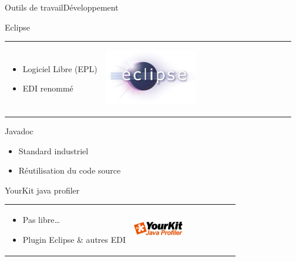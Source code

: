 \begin{frame}{Outils de travail}{Développement}
\begin{block}{Eclipse}
	\begin{tabular}{l l}
			\begin{minipage}{0.5\textwidth}
				\begin{itemize}
				\item Logiciel Libre (EPL)
				\item EDI renommé
				\end{itemize}
		\end{minipage}&\begin{minipage}{0.5\textwidth}
		\begin{center}
			\includegraphics[width=0.5\textwidth]{img/outils/eclipse_logo}
		\end{center}
		\end{minipage}
	\end{tabular}
\end{block}
\begin{block}{Javadoc}
	\begin{itemize}
	\item Standard industriel
	\item Réutilisation du code source
	\end{itemize}
\end{block}
\begin{block}{YourKit java profiler}
	\begin{tabular}{l l}
			\begin{minipage}{0.5\textwidth}
				\begin{itemize}
				\item Pas libre\ldots
				\item Plugin Eclipse \& autres EDI
				\end{itemize}
		\end{minipage}&\begin{minipage}{0.5\textwidth}
		\begin{center}
			\includegraphics[width=0.5\textwidth]{img/outils/yourkit_logo}
		\end{center}
		\end{minipage}
	\end{tabular}
\end{block}
\end{frame}